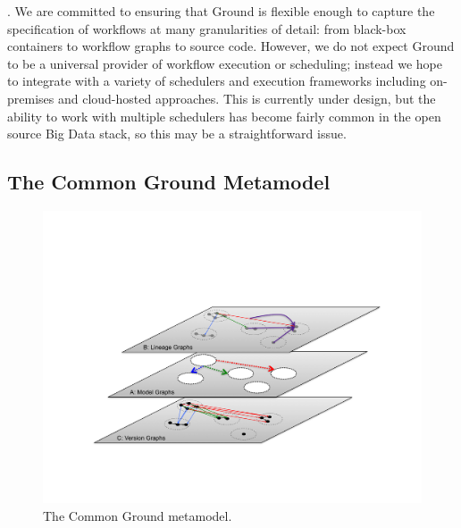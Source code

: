\documentclass{cidr-2017}
\begin{document}
. 
We are committed to ensuring that Ground is flexible enough to capture the specification of workflows at many granularities of detail: from black-box containers to workflow graphs to source code.  
However, we do not expect Ground to be a universal provider of workflow execution or scheduling; instead we hope to integrate with a variety of schedulers and execution frameworks including on-premises and cloud-hosted approaches. 
This is currently under design, but the ability to work with multiple schedulers has become fairly common in the open source Big Data stack, so this may be a straightforward issue.

\smallitembot

\subsection{The Common Ground Metamodel}
\label{sec:metamodel}

\begin{figure}[t]
\centering
\includegraphics[width=\linewidth]{layers.pdf}
\caption{The Common Ground metamodel.} 
\label{fig:layers}
\end{figure}
\end{document}
